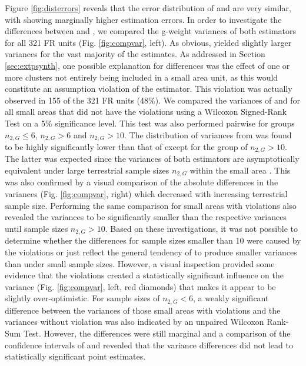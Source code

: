 Figure \ref{fig:disterrors} reveals that the error distribution of \psmall{} and \extpsynth{} are very similar, with \psmall{} showing marginally higher estimation errors. In order to investigate the differences between \psmall{} and \extpsynth{}, we compared the g-weight variances of both estimators for all 321 FR units (Fig. \ref{fig:compvar}, left). As obvious, \psmall{} yielded slightly larger variances for the vast majority of the estimates. As addressed in Section \ref{sec:extpsynth}, one possible explanation for differences was the effect of one or more clusters not entirely being included in a small area unit, as this would constitute an assumption violation of the \extpsynth{} estimator. This violation was actually observed in 155 of the 321 FR units (48\%). We compared the variances of \psmall{} and \extpsynth{} for all small areas that did not have the violations using a Wilcoxon Signed-Rank Test \citep{wilcoxon1970} on a 5\% significance level. This test was also performed pairwise for groups $n_{2,G} \leq 6$, $n_{2,G} > 6$ and $n_{2,G} > 10$. The distribution of variances from \extpsynth{} was found to be highly significantly lower than that of \psmall{} except for the group of $n_{2,G} > 10$. The latter was expected since the variances of both estimators are asymptotically equivalent under large terrestrial sample sizes $n_{2,G}$ within the small area \citep[pp.17--18]{mandallaz2016}. This was also confirmed by a visual comparison of the absolute differences in the variances (Fig. \ref{fig:compvar}, right) which decreased with increasing terrestrial sample size. Performing the same comparison for small areas with violations also revealed the \extpsynth{} variances to be significantly smaller than the respective \psmall{} variances until sample sizes $n_{2,G} > 10$. Based on these investigations, it was not possible to determine whether the differences for sample sizes smaller than 10 were caused by the violations or just reflect the general tendency of \extpsynth{} to produce smaller variances than \psmall{} under small sample sizes. However, a visual inspection provided some evidence that the violations created a statistically significant influence on the \extpsynth{} variance (Fig. \ref{fig:compvar}, left, red diamonds) that makes it appear to be slightly over-optimistic. For sample sizes of $n_{2,G} < 6$, a weakly significant difference between the \extpsynth{} variances of those small areas with violations and the \extpsynth{} variances without violation was also indicated by an unpaired Wilcoxon Rank-Sum Test. However, the differences were still marginal and a comparison of the confidence intervals of \psmall{} and \extpsynth{} revealed that the variance differences did not lead to statistically significant point estimates.

